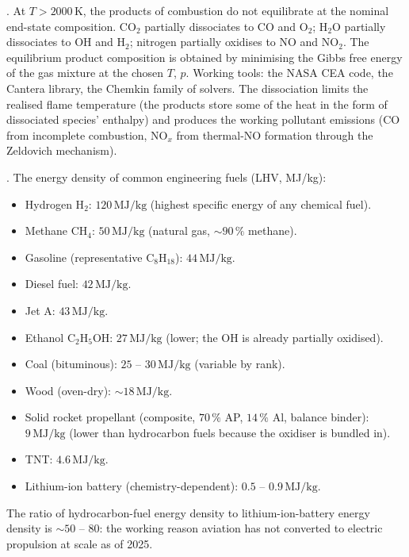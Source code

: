 . At $T > 2000\,
\si{\kelvin}$, the products of combustion do not equilibrate at the
nominal end-state composition. CO$_2$ partially dissociates to CO and
O$_2$; H$_2$O partially dissociates to OH and H$_2$; nitrogen
partially oxidises to NO and NO$_2$. The equilibrium product
composition is obtained by minimising the Gibbs free energy of the
gas mixture at the chosen $T$, $p$. Working tools: the NASA CEA code,
the Cantera library, the Chemkin family of solvers. The dissociation
limits the realised flame temperature (the products store some of the
heat in the form of dissociated species' enthalpy) and produces the
working pollutant emissions (CO from incomplete combustion, NO$_x$
from thermal-NO formation through the Zeldovich mechanism).

. The
energy density of common engineering fuels (LHV, MJ/kg):

\begin{itemize}[leftmargin=*]
\item Hydrogen H$_2$: $120\,\text{MJ}/\text{kg}$ (highest specific
  energy of any chemical fuel).
\item Methane CH$_4$: $50\,\text{MJ}/\text{kg}$ (natural gas, $\sim
  90\,\%$ methane).
\item Gasoline (representative C$_8$H$_{18}$): $44\,\text{MJ}/\text{kg}$.
\item Diesel fuel: $42\,\text{MJ}/\text{kg}$.
\item Jet A: $43\,\text{MJ}/\text{kg}$.
\item Ethanol C$_2$H$_5$OH: $27\,\text{MJ}/\text{kg}$ (lower; the OH
  is already partially oxidised).
\item Coal (bituminous): $25$ -- $30\,\text{MJ}/\text{kg}$ (variable by
  rank).
\item Wood (oven-dry): $\sim 18\,\text{MJ}/\text{kg}$.
\item Solid rocket propellant (composite, $70\,\%$ AP, $14\,\%$
  Al, balance binder): $9\,\text{MJ}/\text{kg}$ (lower than
  hydrocarbon fuels because the oxidiser is bundled in).
\item TNT: $4.6\,\text{MJ}/\text{kg}$.
\item Lithium-ion battery (chemistry-dependent): $0.5$ -- $0.9\,
  \text{MJ}/\text{kg}$.
\end{itemize}

The ratio of hydrocarbon-fuel energy density to lithium-ion-battery
energy density is $\sim 50$ -- $80$: the working reason aviation has
not converted to electric propulsion at scale as of 2025.

